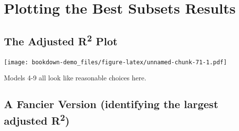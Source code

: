 \documentclass[]{book}
\newenvironment{Shaded}{\begin{snugshade}}{\end{snugshade}}
\newcommand{\KeywordTok}[1]{\textcolor[rgb]{0.13,0.29,0.53}{\textbf{#1}}}
\newcommand{\DataTypeTok}[1]{\textcolor[rgb]{0.13,0.29,0.53}{#1}}
\newcommand{\DecValTok}[1]{\textcolor[rgb]{0.00,0.00,0.81}{#1}}
\newcommand{\StringTok}[1]{\textcolor[rgb]{0.31,0.60,0.02}{#1}}
\newcommand{\OperatorTok}[1]{\textcolor[rgb]{0.81,0.36,0.00}{\textbf{#1}}}
\newcommand{\NormalTok}[1]{#1}
\theoremstyle{definition}
\theoremstyle{definition}
\theoremstyle{definition}
\theoremstyle{remark}
\begin{document}
\section{Plotting the Best Subsets
Results}\label{plotting-the-best-subsets-results}

\subsection{\texorpdfstring{The Adjusted R\textsuperscript{2}
Plot}{The Adjusted R2 Plot}}\label{the-adjusted-r2-plot}

\begin{Shaded}
\end{Shaded}

\texttt{[image: bookdown-demo\_files/figure-latex/unnamed-chunk-71-1.pdf]}

Models 4-9 all look like reasonable choices here.

\subsection{\texorpdfstring{A Fancier Version (identifying the largest
adjusted
R\textsuperscript{2})}{A Fancier Version (identifying the largest adjusted R2)}}\label{a-fancier-version-identifying-the-largest-adjusted-r2}
\end{document}
